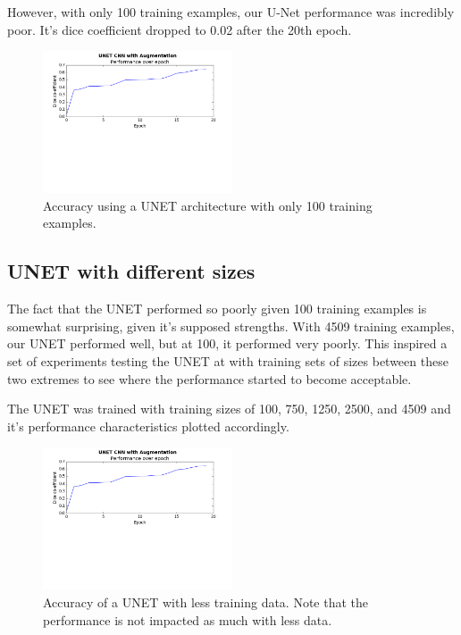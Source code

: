 \documentclass[letterpaper]{article}
\begin{document}
However, with only 100 training examples, our U-Net performance was incredibly poor. It's dice coefficient dropped to 0.02 after the 20th epoch.

 \begin{figure}[H]
  \centerline{\includegraphics[width=0.5\textwidth]{Plots/SegNet.png}}
  \caption{Accuracy using a UNET architecture with only 100 training examples.}
  \label{fig:trainingovertime2.}
\end{figure}

\subsection{UNET with different sizes}
The fact that the UNET performed so poorly given 100 training examples is somewhat surprising, given it's supposed strengths. With 4509 training examples, our UNET performed well, but at 100, it performed very poorly. This inspired a set of experiments testing the UNET at with training sets of sizes between these two extremes to see where the performance started to become acceptable. 

The UNET was trained with training sizes of 100, 750, 1250, 2500, and 4509 and it's performance characteristics plotted accordingly. 

 \begin{figure}[H]
  \centerline{\includegraphics[width=0.5\textwidth]{Plots/SegNet.png}}
  \caption{Accuracy of a UNET with less training data. Note that the performance is not impacted as much with less data.}
  \label{fig:trainingovertime2.}
\end{figure}
\end{document}
